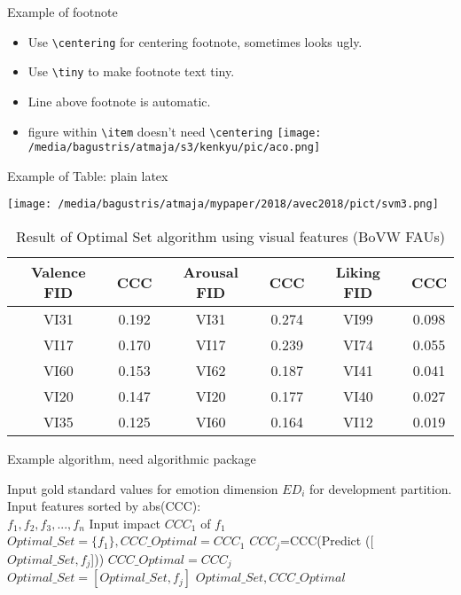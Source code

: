 \documentclass{beamer}
\begin{document}
\begin{frame}[t, fragile]{Example of footnote}
\begin{itemize}
\item Use \verb|\centering| for centering footnote, sometimes looks ugly.
\item Use \verb|\tiny| to make footnote text tiny\footnotemark.
\item Line above footnote is automatic.
\item figure within \verb|\item| doesn't need \verb|\centering|
\texttt{[image: /media/bagustris/atmaja/s3/kenkyu/pic/aco.png]}
\end{itemize}
\end{frame}

\begin{frame}[t, fragile]{Example of Table: plain latex}
\begin{center}
\texttt{[image: /media/bagustris/atmaja/mypaper/2018/avec2018/pict/svm3.png]}
\begin{table}
  \caption{Result of Optimal Set algorithm using visual features (BoVW FAUs)}
  \label{tab:val}
  \begin{tabular}{c c c c c c}
    \hline
    Valence FID	& CCC & Arousal FID	& CCC	& Liking FID &	CCC \\
    \hline
	VI31	&	0.192	&	VI31	&	0.274	&	VI99	&	0.098	\\
	VI17	&	0.170	&	VI17	&	0.239	&	VI74	&	0.055	\\
	VI60	&	0.153	&	VI62	&	0.187	&	VI41	&	0.041	\\
	VI20	&	0.147	&	VI20	&	0.177	&	VI40	&	0.027	\\
	VI35	&	0.125	&	VI60	&	0.164	&	VI12	&	0.019	\\
	\hline
	\end{tabular}
\end{table}
\end{center}
\end{frame}

\begin{frame}[t, fragile]{Example algorithm, need algorithmic package}
 \begin{algorithmic}[1]
    \STATE  Input gold standard values for emotion 
        dimension $ED_i$ for development partition.
    \STATE Input features sorted by abs(CCC):
        \\ $f_1, f_2, f_3,...,f_n$ 
    \STATE Input impact $CCC_1$  of  $f_1$ 
    \STATE $Optimal\_Set = \{f_1\}, CCC\_Optimal = CCC_1$
  \STATE $CCC_j$=CCC(Predict ([$Optimal\_Set, f_j$]))
  \STATE $CCC\_Optimal = CCC_j$        
        \\ $Optimal\_Set = [Optimal\_Set, f_j]$
  \ENDIF
  \ENDFOR
 \RETURN $Optimal\_Set, CCC\_Optimal$
 \end{algorithmic} 
\end{frame}
\end{document}
